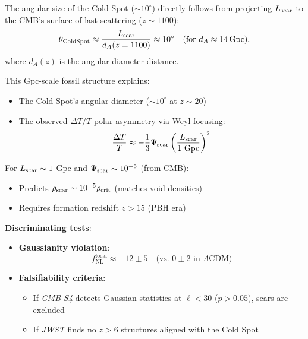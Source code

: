 \documentclass{article}
\begin{document}
The angular size of the Cold Spot ($\sim 10^\circ$) directly follows from projecting $L_{\rm scar}$ to the CMB's surface of last scattering ($z \sim 1100$):
\begin{equation}
\theta_{\rm Cold Spot} \approx \frac{L_{\rm scar}}{d_A(z=1100)} \approx 10^\circ \quad \text{(for } d_A \approx 14\,\text{Gpc)},
\end{equation}
where $d_A(z)$ is the angular diameter distance. \\ \par

This Gpc-scale fossil structure explains:
\begin{itemize}
\item The Cold Spot's angular diameter ($\sim 10^\circ$ at $z\sim20$)
\item The observed $\Delta T/T$ polar asymmetry via Weyl focusing:
\begin{equation}
\frac{\Delta T}{T} \approx -\frac{1}{3}\Psi_{\rm scar} \left(\frac{L_{\rm scar}}{1~{\rm Gpc}}\right)^2
\end{equation}
\end{itemize}

\begin{tcolorbox}
[colback=boxnormal,
    colframe=blue!50!black,
title=Scale Consistency Check]
For $L_{\rm scar} \sim 1$ Gpc and $\Psi_{\rm scar} \sim 10^{-5}$ (from CMB):
\begin{itemize}
\item Predicts $\rho_{\rm scar} \sim 10^{-5}\rho_{\rm crit}$ (matches void densities)
\item Requires formation redshift $z > 15$ (PBH era)
\end{itemize}
\end{tcolorbox}

\textbf{Discriminating tests}:
\begin{itemize}
\item \textbf{Gaussianity violation}: 
\begin{equation}
f_\text{NL}^\text{local} \approx -12 \pm 5 \quad \text{(vs. $0 \pm 2$ in $\Lambda$CDM)}
\end{equation}

\item \textbf{Falsifiability criteria}:
\begin{itemize}
\item If \textit{CMB-S4} detects Gaussian statistics at $\ell < 30$ ($p > 0.05$), scars are excluded
\item If \textit{JWST} finds no $z > 6$ structures aligned with the Cold Spot
\end{itemize}
\end{itemize}
\end{document}
